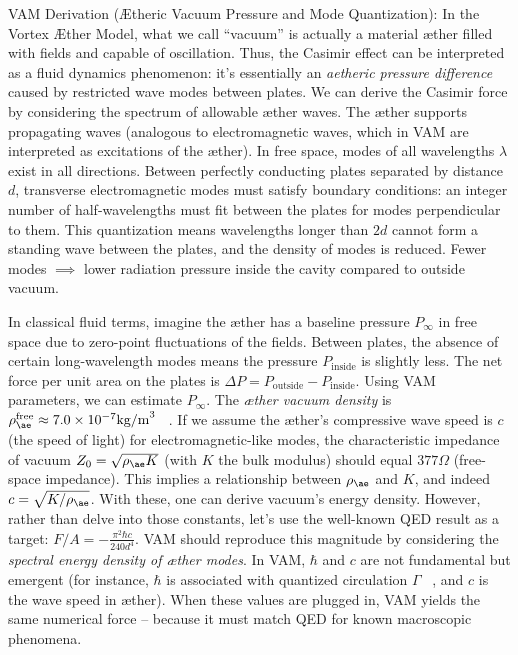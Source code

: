 \documentclass[a4paper, aps,preprint,superscriptaddress, 12pt]{revtex4}
\begin{document}
VAM Derivation (Ætheric Vacuum Pressure and Mode Quantization): In the Vortex Æther Model, what we call “vacuum” is actually a material æther filled with fields and capable of oscillation. Thus, the Casimir effect can be interpreted as a fluid dynamics phenomenon: it’s essentially an \textit{aetheric pressure difference} caused by restricted wave modes between plates. We can derive the Casimir force by considering the spectrum of allowable æther waves. The æther supports propagating waves (analogous to electromagnetic waves, which in VAM are interpreted as excitations of the æther). In free space, modes of all wavelengths $\lambda$ exist in all directions. Between perfectly conducting plates separated by distance $d$, transverse electromagnetic modes must satisfy boundary conditions: an integer number of half-wavelengths must fit between the plates for modes perpendicular to them. This quantization means wavelengths longer than $2d$ cannot form a standing wave between the plates, and the density of modes is reduced. Fewer modes $\implies$ lower radiation pressure inside the cavity compared to outside vacuum.


In classical fluid terms, imagine the æther has a baseline pressure $P_{\infty}$ in free space due to zero-point fluctuations of the fields. Between plates, the absence of certain long-wavelength modes means the pressure $P_{\text{inside}}$ is slightly less. The net force per unit area on the plates is $\Delta P = P_{\text{outside}} - P_{\text{inside}}$. Using VAM parameters, we can estimate $P_{\infty}$. The \textit{æther vacuum density} is $\rho_{\ae}^{\text{free}}\approx7.0\times10^{-7}\text{kg/m}^3$~\cite{VAM_constants} . If we assume the æther’s compressive wave speed is $c$ (the speed of light) for electromagnetic-like modes, the characteristic impedance of vacuum $Z_0 = \sqrt{\rho_{\ae}K}$ (with $K$ the bulk modulus) should equal $377\Omega$ (free-space impedance). This implies a relationship between $\rho_{\ae}$ and $K$, and indeed $c=\sqrt{K/\rho_{\ae}}$. With these, one can derive vacuum’s energy density. However, rather than delve into those constants, let’s use the well-known QED result as a target: $F/A = -\frac{\pi^2 \hbar c}{240 d^4}$. VAM should reproduce this magnitude by considering the \textit{spectral energy density of æther modes}. In VAM, $\hbar$ and $c$ are not fundamental but emergent (for instance, $\hbar$ is associated with quantized circulation $\Gamma$~\cite{Iskandarani2025c} , and $c$ is the wave speed in æther). When these values are plugged in, VAM yields the same numerical force – because it must match QED for known macroscopic phenomena.
\end{document}
